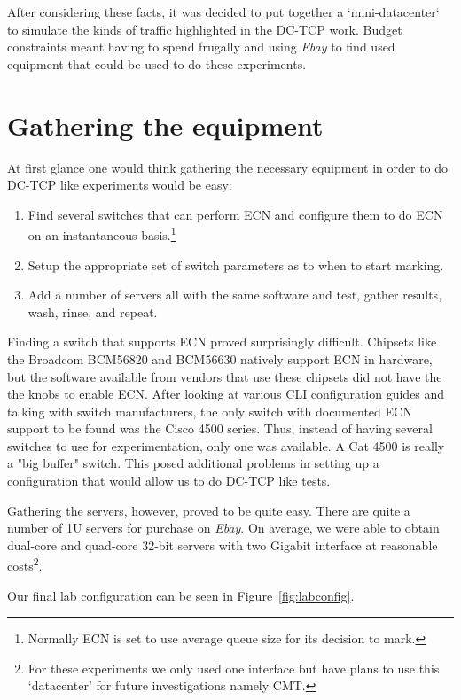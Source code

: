 \documentclass[12pt]{article}
\begin{document}
After considering these facts, it was decided to put together a `mini-datacenter` to simulate the
kinds of traffic highlighted in the DC-TCP work. Budget constraints meant having to spend frugally and 
using \emph{Ebay} to find used equipment that could be used to do these experiments.

\section{Gathering the equipment}

At first glance one would think gathering the necessary equipment in order to do DC-TCP like
experiments would be easy:
\begin{enumerate}
\item Find several switches that can perform ECN and configure them
to do ECN on an instantaneous basis.\footnote{Normally ECN is set to use average queue size
for its decision to mark.}

\item Setup the appropriate set of switch parameters as to when to start
marking. 

\item Add a number of servers all with the same software and test, gather results, wash, rinse, and repeat.
\end{enumerate}

Finding a switch that supports ECN proved surprisingly difficult.  
Chipsets like the Broadcom BCM56820 and BCM56630 natively support 
ECN in hardware,  but the software available from vendors that use
these chipsets did not have the the knobs to enable ECN. After looking at various CLI
configuration guides and talking with switch manufacturers, the only switch with documented
ECN support to be found was the Cisco 4500 series. Thus, instead of having several switches
to use for experimentation, only one was available. A Cat 4500 is really a "big buffer"
switch. This posed additional problems in setting up a configuration
that would allow us to do DC-TCP like tests.

Gathering the servers, however, proved to be quite easy. There are quite a number of 1U servers
for purchase on \emph{Ebay}. On average, we were able to obtain dual-core and quad-core 32-bit 
servers with two Gigabit interface at reasonable costs\footnote{For these experiments we only used
one interface but have plans to use this `datacenter' for future investigations  namely CMT.}. 

Our final lab configuration can be seen in Figure~\ref{fig:labconfig}.
\end{document}

